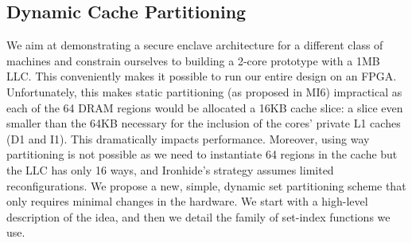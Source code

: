 \subsection{Dynamic Cache Partitioning}
\label{sec:dynamiccache}
We aim at demonstrating a secure enclave architecture for a different class of machines and constrain ourselves to building a 2-core prototype with a 1MB LLC.
This conveniently makes it possible to run our entire design on an FPGA.
Unfortunately, this makes static partitioning (as proposed in MI6) impractical as each of the 64 DRAM regions would be allocated a 16KB cache slice: a slice even smaller than the 64KB necessary for the inclusion of the cores' private L1 caches (D1 and I1).
This dramatically impacts performance.
Moreover, using way partitioning \cite{kiriansky2018dawg} is not possible as we need to instantiate 64 regions in the cache but the LLC has only 16 ways, and Ironhide's \cite{ironhide} strategy assumes limited reconfigurations.
We propose a new, simple, dynamic set partitioning scheme that only requires minimal changes in the hardware. 
We start with a high-level description of the idea, and then we detail the family of set-index functions we use.

